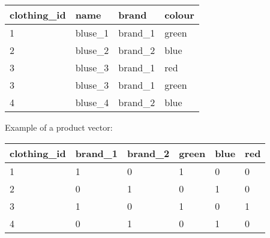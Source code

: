 \noindent
{}
\begin{tabular}{ l | l | l | l }
    \rowcolor{LightSlateGrey}
    \textbf{clothing\_id}   & \textbf{name} & \textbf{brand}    & \textbf{colour}\\\hline
    1                       & bluse\_1      & brand\_1          & green\\
    2                       & bluse\_2      & brand\_2          & blue\\
    3                       & bluse\_3      & brand\_1          & red\\
    3                       & bluse\_3      & brand\_1          & green\\
    4                       & bluse\_4      & brand\_2          & blue\\
\end{tabular}

\bigskip
\noindent
Example of a product vector:\\

\noindent
{}
\begin{tabular}{ l | l | l | l | l | l }
    \textbf{clothing\_id}   & \textbf{brand\_1} & \textbf{brand\_2} & \textbf{green}    & \textbf{blue} & \textbf{red}\\\hline
    1                       & 1                 & 0                 & 1                 & 0             & 0\\
    2                       & 0                 & 1                 & 0                 & 1             & 0\\
    3                       & 1                 & 0                 & 1                 & 0             & 1\\
    4                       & 0                 & 1                 & 0                 & 1             & 0\\
\end{tabular}









